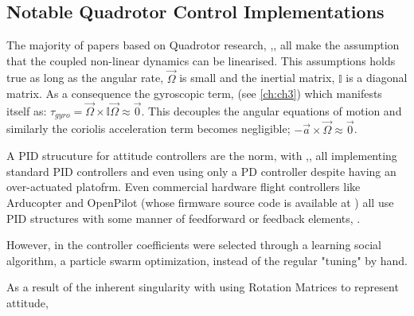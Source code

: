 \subsection{Notable Quadrotor Control Implementations}
\label{subsec:intro.lit.control}
The majority of papers based on Quadrotor research, \cite{quaddynamics},\cite{optimizedPID}, \cite{fourrotorrobot} all make the assumption that the coupled non-linear dynamics can be linearised. This assumptions holds true as long as the angular rate, $\vec{\Omega}$ is small and the inertial matrix, $\mathbb{I}$ is a diagonal matrix. As a consequence the gyroscopic term, (see \ref{ch:ch3}) which manifests itself as: $\tau _{gyro} = \vec{\Omega} \times \mathbb{I} \vec{\Omega} \approx \vec{0}$. This decouples the angular equations of motion and similarly the coriolis acceleration term becomes negligible; $-\vec{a} \times \vec{\Omega} \approx \vec{0}$.
\par
A PID strucuture for attitude controllers are the norm, with \cite{optimizedPID},\cite{quaddynamics},\cite{tiltpropellerflight} all implementing standard PID controllers and even \cite{singleaxistilting} using only a PD controller despite having an over-actuated platofrm. Even commercial hardware flight controllers like Arducopter\cite{arducopter} and OpenPilot \cite{openpilot}(whose firmware source code is available at \cite{openpilotgit}) all use PID structures with some manner of feedforward or feedback elements, \cite{buildyourownquad}.

However, in \cite{optimizedPID} the controller coefficients were selected through a learning social algorithm, a particle swarm optimization, instead of the regular "tuning" by hand. 
\par
As a result of the inherent singularity with using Rotation Matrices to represent attitude, 
